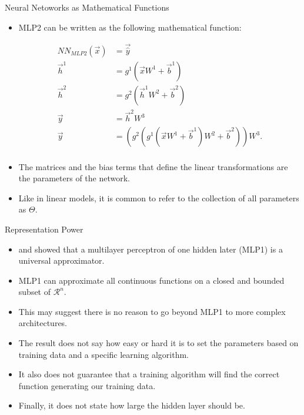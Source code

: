\documentclass[handout]{beamer}
\begin{document}
\begin{frame}{Neural Netoworks as Mathematical Functions}
\begin{scriptsize}
\begin{itemize}
\item MLP2 can be written as the following mathematical function:
\begin{center}
\begin{equation}
\begin{split}
NN_{MLP2}(\vec{x}) & =  \vec{\hat{y}}  \\
\vec{h}^{1} &  = g^{1}(\vec{x}W^{1}+\vec{b}^{1}) \\
\vec{h}^{2} &  = g^{2}(\vec{h}^{1}W^{2}+\vec{b}^{2}) \\
\vec{y} &  = \vec{h}^{2}W^{3}\\
\vec{y} &  = (g^2(g^1(\vec{x}W^{1}+\vec{b}^{1})W^2+\vec{b}^2))W^3.\\
\end{split}
\end{equation}
\end{center}
\item The matrices and the bias terms that define the linear transformations are the parameters of the network. 
\item Like in linear models, it is common to refer to the collection of all parameters as $\Theta$.
\end{itemize}
\end{scriptsize}
\end{frame}



\begin{frame}{Representation Power}
\begin{scriptsize}
\begin{itemize}
\item \cite{hornik1989multilayer} and \cite{cybenko1989approximation} showed that a multilayer perceptron of one hidden later (MLP1) is a universal approximator.
\item MLP1 can approximate all continuous functions on a closed and bounded subset of $\mathcal{R}^n$.
\item This may suggest there is no reason to go beyond MLP1 to more complex architectures.
\item The result does not say how easy or hard it is to set the parameters based on training data and a specific learning algorithm.
\item It also does not guarantee that a training algorithm will find
the correct function generating our training data.
\item Finally, it does not state how large the hidden layer should be.
\end{itemize}


\end{scriptsize}
\end{frame}
\end{document}
